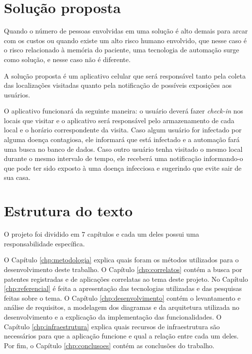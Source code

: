 \section{Solução proposta}\label{sec:solucao}
Quando o número de pessoas envolvidas em uma solução é alto demais para arcar com os custos ou quando existe um alto risco humano envolvido, que nesse caso é o risco relacionado à memória do paciente, uma tecnologia de automação surge como solução, e nesse caso não é diferente.

A solução proposta é um aplicativo celular que será responsável tanto pela coleta das localizações visitadas quanto pela notificação de possíveis exposições aos usuários.

O aplicativo funcionará da seguinte maneira: o usuário deverá fazer \textit{check-in} nos locais que visitar e o aplicativo será responsável pelo armazenamento de cada local e o horário correspondente da visita. Caso algum usuário for infectado por alguma doença contagiosa, ele informará que está infectado e a automação fará uma busca no banco de dados. Caso outro usuário tenha visitado o mesmo local durante o mesmo intervalo de tempo, ele receberá uma notificação informando-o que pode ter sido exposto à uma doença infecciosa e sugerindo que evite sair de sua casa.

\section{Estrutura do texto}\label{sec:estrutura}

O projeto foi dividido em 7 capítulos e cada um deles possui uma responsabilidade específica.

O Capítulo \ref{chp:metodologia} explica quais foram os métodos utilizados para o desenvolvimento deste trabalho. O Capítulo \ref{chp:correlatos} contém a busca por patentes registradas e de aplicações correlatas ao tema deste projeto. No Capítulo \ref{chp:referencial} é feita a apresentação das tecnologias utilizadas e das pesquisas feitas sobre o tema. O Capítulo \ref{chp:desenvolvimento} contém o levantamento e análise de requisitos, a modelagem dos diagramas e da arquitetura utilizada no desenvolvimento e a explicação da implementação das funcionalidades. O Capítulo \ref{chp:infraestrutura} explica quais recursos de infraestrutura são necessários para que a aplicação funcione e qual a relação entre cada um deles. Por fim, o Capítulo \ref{chp:conclusoes} contém as conclusões do trabalho.



